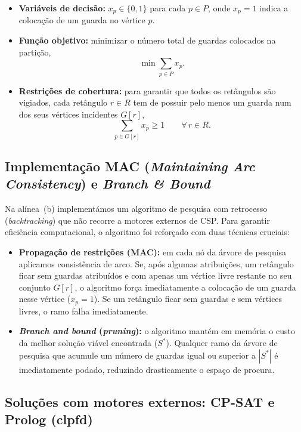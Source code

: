 \documentclass[11pt,a4paper]{article}
\begin{document}
\begin{itemize}[topsep=2pt,itemsep=2pt]
  \item \textbf{Variáveis de decisão:} $x_p \in \{0,1\}$ para cada
    $p \in P$, onde $x_p = 1$ indica a colocação de um guarda no
    vértice $p$.
  \item \textbf{Função objetivo:} minimizar o número total de guardas
    colocados na partição,
    \[ \min \sum_{p \in P} x_p . \]
  \item \textbf{Restrições de cobertura:} para garantir que todos os
    retângulos são vigiados, cada retângulo $r \in R$ tem de possuir
    pelo menos um guarda num dos seus vértices incidentes $G[r]$,
    \[ \sum_{p \in G[r]} x_p \ge 1 \qquad \forall\, r \in R . \]
\end{itemize}

\subsection{Implementação MAC (\emph{Maintaining Arc Consistency}) e \emph{Branch \& Bound}}

Na alínea~(b) implementámos um algoritmo de pesquisa com retrocesso
(\emph{backtracking}) que não recorre a motores externos de CSP. Para
garantir eficiência computacional, o algoritmo foi reforçado com duas
técnicas cruciais:

\begin{itemize}[topsep=2pt,itemsep=2pt]
  \item \textbf{Propagação de restrições (MAC):} em cada nó da árvore
    de pesquisa aplicamos consistência de arco. Se, após algumas
    atribuições, um retângulo ficar sem guardas atribuídos e com
    apenas um vértice livre restante no seu conjunto $G[r]$, o
    algoritmo força imediatamente a colocação de um guarda nesse
    vértice ($x_p = 1$). Se um retângulo ficar sem guardas e sem
    vértices livres, o ramo falha imediatamente.
  \item \textbf{\emph{Branch and bound} (\emph{pruning}):} o algoritmo
    mantém em memória o custo da melhor solução viável encontrada
    ($S^*$). Qualquer ramo da árvore de pesquisa que acumule um número
    de guardas igual ou superior a $|S^*|$ é imediatamente podado,
    reduzindo drasticamente o espaço de procura.
\end{itemize}

\subsection{Soluções com motores externos: CP-SAT e Prolog (clpfd)}
\end{document}
